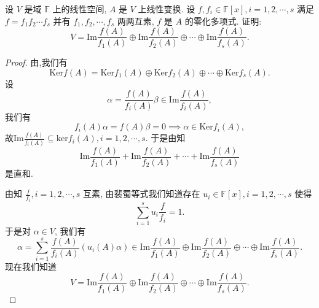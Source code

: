 \documentclass[../../main.tex]{subfiles}%
\begin{document}
\begin{proposition}\label{proposition:互素分式多项式诱导的值域直和分解}
设 $V$ 是域 $\mathbb{F}$ 上的线性空间, $A$ 是 $V$ 上线性变换. 设 $f, f_i \in \mathbb{F}[x], i = 1, 2, \cdots, s$ 满足 $f = f_1f_2\cdots f_s$ 并有 $f_1, f_2, \cdots, f_s$ 两两互素, $f$ 是 $A$ 的零化多项式. 证明:
$$
V = \mathrm{Im} \frac{f(A)}{f_1(A)} \oplus \mathrm{Im} \frac{f(A)}{f_2(A)} \oplus \cdots \oplus \mathrm{Im} \frac{f(A)}{f_s(A)}.
$$
\end{proposition}
\begin{proof}

由,我们有
$$
\mathrm{Ker} f(A) = \mathrm{Ker} f_1(A) \oplus \mathrm{Ker} f_2(A) \oplus \cdots \oplus \mathrm{Ker} f_s(A).
$$
设
$$
\alpha = \frac{f(A)}{f_i(A)} \beta \in \mathrm{Im} \frac{f(A)}{f_i(A)},
$$
我们有
$$
f_i(A) \alpha = f(A) \beta = 0 \implies \alpha \in \mathrm{Ker} f_i(A),
$$
故$\mathrm{Im}\frac{f\left( A \right)}{f_i\left( A \right)}\subseteq \mathrm{ker}f_i\left( A \right) ,i=1,2,\cdots ,s.$
于是由知
$$
\mathrm{Im} \frac{f(A)}{f_1(A)} + \mathrm{Im} \frac{f(A)}{f_2(A)} + \cdots + \mathrm{Im} \frac{f(A)}{f_s(A)}
$$
是直和.

由知 $\frac{f}{f_i}, i = 1, 2, \cdots, s$ 互素, 由裴蜀等式我们知道存在 $u_i \in \mathbb{F}[x], i = 1, 2, \cdots, s$ 使得
$$
\sum_{i=1}^s u_i \frac{f}{f_i} = 1.
$$
于是对 $\alpha \in V$, 我们有
$$
\alpha = \sum_{i=1}^s \frac{f(A)}{f_i(A)} (u_i(A) \alpha) \in \mathrm{Im} \frac{f(A)}{f_1(A)} \oplus \mathrm{Im} \frac{f(A)}{f_2(A)} \oplus \cdots \oplus \mathrm{Im} \frac{f(A)}{f_s(A)}.
$$
现在我们知道
$$
V = \mathrm{Im} \frac{f(A)}{f_1(A)} \oplus \mathrm{Im} \frac{f(A)}{f_2(A)} \oplus \cdots \oplus \mathrm{Im} \frac{f(A)}{f_s(A)}.
$$

\end{proof}
\end{document}
